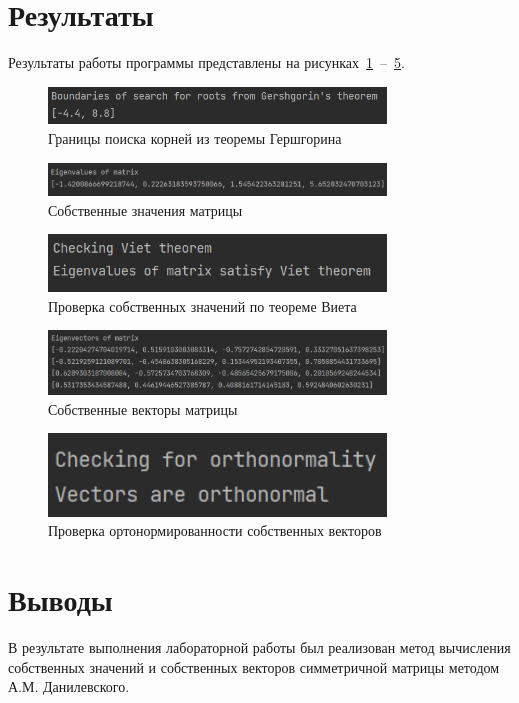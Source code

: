 \documentclass[a4paper, 14pt]{extarticle}
\begin{document}
\section{Результаты}\label{Sect::res}

Результаты работы программы представлены на рисунках~\ref{fig:img1}~--~\ref{fig:img5}.

\begin{figure}[!htb]
	\centering
	\includegraphics[width=0.8\textwidth]{img1}
\caption{Границы поиска корней из теоремы Гершгорина}
\label{fig:img1}
\end{figure}

\begin{figure}[!htb]
	\centering
	\includegraphics[width=0.8\textwidth]{img2}
\caption{Собственные значения матрицы}
\label{fig:img2}
\end{figure}

\begin{figure}[!htb]
	\centering
	\includegraphics[width=0.8\textwidth]{img3}
\caption{Проверка собственных значений по теореме Виета}
\label{fig:img3}
\end{figure}

\begin{figure}[!htb]
	\centering
	\includegraphics[width=0.8\textwidth]{img4}
\caption{Собственные векторы матрицы}
\label{fig:img4}
\end{figure}

\begin{figure}[!htb]
	\centering
	\includegraphics[width=0.8\textwidth]{img5}
\caption{Проверка ортонормированности собственных векторов}
\label{fig:img5}
\end{figure}

\section{Выводы}\label{Sect::conclusion}

В результате выполнения лабораторной работы был реализован метод вычисления собственных значений и собственных векторов симметричной матрицы методом А.М. Данилевского.
\end{document}
